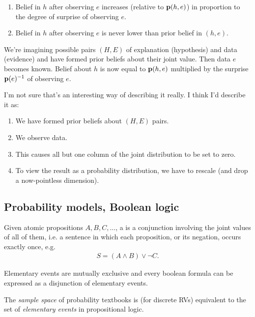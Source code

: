 \begin{enumerate}
\item Belief in $h$ after observing $e$ increases (relative to $\mathbf{p}(h,e)$) in proportion to the degree of surprise of observing $e$.
\item Belief in $h$ after observing $e$ is never lower than prior belief in $(h, e)$.
\end{enumerate}

\begin{intuition}
  We're imagining possible pairs $(H, E)$ of explanation (hypothesis) and data (evidence) and have formed prior beliefs about their joint value. Then data $e$ becomes known. Belief about $h$ is now equal to $\mathbf{p}(h,e)$ multiplied by the surprise $\mathbf{p}(e)^{-1}$ of observing $e$.

  I'm not sure that's an interesting way of describing it really. I think I'd describe it as:
  \begin{enumerate}
  \item We have formed prior beliefs about $(H, E)$ pairs.
  \item We observe data.
  \item This causes all but one column of the joint distribution to be set to zero.
  \item To view the result as a probability distribution, we have to rescale (and drop a now-pointless dimension).
  \end{enumerate}
\end{intuition}


\subsection{Probability models, Boolean logic}

Given atomic propositions $A, B, C, \ldots$, a  is a conjunction involving the joint values of all of them, i.e. a sentence in which each proposition, or its negation, occurs exactly once, e.g.
\begin{align*}
  S = (A \land B) \lor \lnot C.
\end{align*}

\begin{theorem*}
  Elementary events are mutually exclusive and every boolean formula can be expressed as a disjunction of elementary events.
\end{theorem*}

The {\it sample space} of probability textbooks is (for discrete RVs) equivalent to the set of {\it elementary events} in propositional logic.

